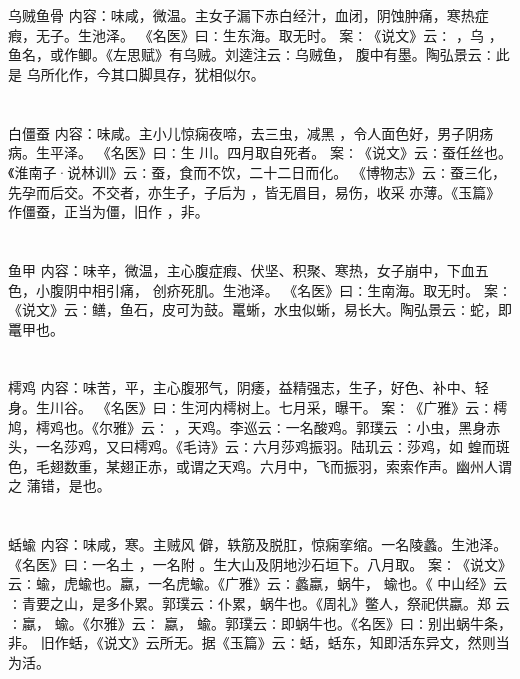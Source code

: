 \documentclass[12pt,UTF8]{ctexbook}
\begin{document}
\chapter{}乌贼鱼骨
内容：味咸，微温。主女子漏下赤白经汁，血闭，阴蚀肿痛，寒热症瘕，无子。生池泽。 
《名医》曰∶生东海。取无时。 
案∶《说文》云∶ ，乌 ，鱼名，或作鲫。《左思赋》有乌贼。刘逵注云∶乌贼鱼， 
腹中有墨。陶弘景云∶此是 乌所化作，今其口脚具存，犹相似尔。 


\chapter{}白僵蚕
内容：味咸。主小儿惊痫夜啼，去三虫，减黑 ，令人面色好，男子阴疡病。生平泽。 
《名医》曰∶生 川。四月取自死者。 
案∶《说文》云∶蚕任丝也。《淮南子·说林训》云∶蚕，食而不饮，二十二日而化。 
《博物志》云∶蚕三化，先孕而后交。不交者，亦生子，子后为 ，皆无眉目，易伤，收采 
亦薄。《玉篇》作僵蚕，正当为僵，旧作 ，非。 


\chapter{}鱼甲
内容：味辛，微温，主心腹症瘕、伏坚、积聚、寒热，女子崩中，下血五色，小腹阴中相引痛， 
创疥死肌。生池泽。 
《名医》曰∶生南海。取无时。 
案∶《说文》云∶鳝，鱼石，皮可为鼓。鼍蜥，水虫似蜥，易长大。陶弘景云∶蛇，即 
鼍甲也。 


\chapter{}樗鸡
内容：味苦，平，主心腹邪气，阴痿，益精强志，生子，好色、补中、轻身。生川谷。 
《名医》曰∶生河内樗树上。七月采，曝干。 
案∶《广雅》云∶樗鸠，樗鸡也。《尔雅》云∶ ，天鸡。李巡云∶一名酸鸡。郭璞云 
∶小虫，黑身赤头，一名莎鸡，又曰樗鸡。《毛诗》云∶六月莎鸡振羽。陆玑云∶莎鸡，如 
蝗而斑色，毛翅数重，某翅正赤，或谓之天鸡。六月中，飞而振羽，索索作声。幽州人谓之 
蒲错，是也。 


\chapter{}蛞蝓
内容：味咸，寒。主贼风 僻，轶筋及脱肛，惊痫挛缩。一名陵蠡。生池泽。 
《名医》曰∶一名土 ，一名附 。生大山及阴地沙石垣下。八月取。 
案∶《说文》云∶蝓，虎蝓也。蠃，一名虎蝓。《广雅》云∶蠡蠃，蜗牛， 蝓也。《 
中山经》云∶青要之山，是多仆累。郭璞云∶仆累，蜗牛也。《周礼》鳖人，祭祀供蠃。郑 
云∶蠃， 蝓。《尔雅》云∶ 蠃， 蝓。郭璞云∶即蜗牛也。《名医》曰∶别出蜗牛条，非。 
旧作蛞，《说文》云所无。据《玉篇》云∶蛞，蛞东，知即活东异文，然则当为活。 
\end{document}
